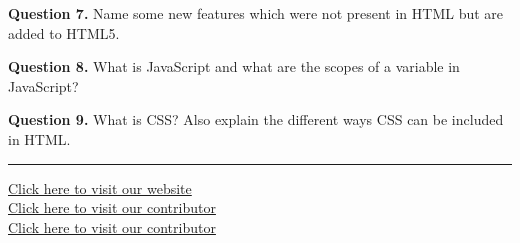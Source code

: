 \documentclass[11pt,a4paper]{article}
\begin{document}
\medskip


\noindent   \textbf{Question 7.} Name some new features which were not present in HTML but are added to HTML5.

\medskip


\noindent   \textbf{Question 8.} What is JavaScript and what are the scopes of a variable in JavaScript?

\medskip


\noindent   \textbf{Question 9.} What is CSS? Also explain the different ways CSS can be included in HTML.

\vfill
\rule{\linewidth}{0.4pt}

\begin{center}\small
\href{https://bhu-exam.vercel.app/}{Click here to visit our website}\\[4pt]\href{https://me-aryan.vercel.app/}{Click here to visit our contributor}\\[4pt]\href{https://quashan-me.vercel.app/}{Click here to visit our contributor}
\end{center}
\end{document}
